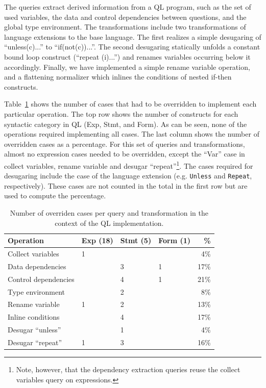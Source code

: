 The queries extract derived information from a QL program, such as the set of used variables, the data and control dependencies between questions, and the global type environment.
The transformations include two transformations of language extensions to the base language.
The first realizes a simple desugaring of ``unless(c){...}'' to ``if(not(c)){...}''.
The second desugaring statically unfolds a constant bound loop construct (``repeat (i){...}'') and renames variables occurring below it accordingly.
Finally, we have implemented a simple rename variable operation, and a flattening normalizer which inlines the conditions of nested if-then constructs.

Table~\ref{TBL:qlresults} shows the number of cases that had to be overridden to implement each particular operation. The top row shows the number of  constructs for each syntactic category in QL (Exp, Stmt, and Form).
As can be seen, none of the operations required implementing all cases.
The last column shows the number of overridden cases as a percentage.
For this set of queries and transformations, almost no expression cases needed to be overridden, except the ``Var'' case in collect variables, rename variable and desugar ``repeat''\footnote{Note, however, that the dependency extraction queries reuse the collect variables query on expressions.}.
The cases required for desugaring include the case of the language extension (e.g. \lstinline{Unless} and \lstinline{Repeat}, respectively). These cases are not counted in the total in the first row but are used to compute the percentage.

\begin{table}[t]
  \centering\small
  \begin{tabular}{@{}llllr@{}}\toprule
    Operation            & Exp (18) & Stmt (5) & Form (1) & \%     \\\hline
    Collect variables    & 1        &          &          & 4\%  \\
    Data dependencies    &          & 3        & 1        & 17\% \\
    Control dependencies &          & 4        & 1        & 21\% \\
    Type environment     &          & 2        &          & 8\%  \\\hline
    Rename variable      & 1        & 2        &          & 13\% \\
    Inline conditions    &          & 4        &          & 17\% \\
    Desugar ``unless''   &          & 1        &          & 4\%  \\
    Desugar ``repeat''   & 1        & 3        &          & 16\% \\\bottomrule
  \end{tabular}
\nocaptionrule   \caption{Number of overriden cases per query and transformation in
    the context of the QL implementation\label{TBL:qlresults}.}
\end{table}

